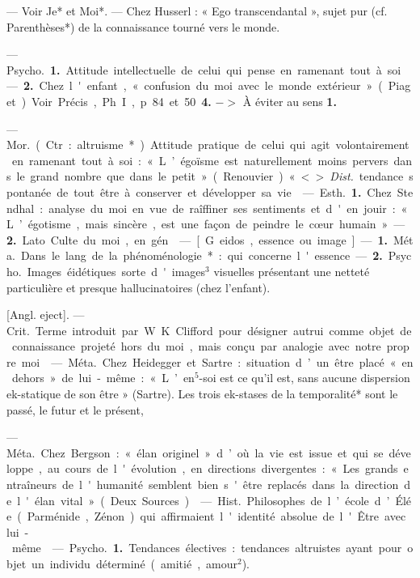 \begin{itemize}[leftmargin=1cm, label=, itemsep=1pt]
 — Voir Je* et Moi*. — Chez
Husserl : « Ego transcendantal »,
sujet pur (cf. Parenthèses*) de la
connaissance tourné vers le monde.

 — \si{Psycho.} {\bf 1.} Attitude
intellectuelle de celui qui pense
en ramenant tout à soi. — {\bf 2.} Chez
l'enfant, « confusion du moi avec le
monde extérieur » (Piaget). Voir
Précis, Ph. I, p. 84 et 50 {\bf 4.} $->$ À
éviter au sens {\bf 1.}

 — \si{Mor.} (Ctr. : altruisme*).
Attitude pratique de celui qui agit
volontairement en ramenant tout à
soi : « L’égoïsme est naturellement
moins pervers dans le grand nombre
que dans le petit » (Renouvier).
«<> {\it Dist.} tendance spontanée de
tout être à conserver et développer
sa vie.

 — \si{Esth.} {\bf 1.} Chez Stendhal :
analyse du moi en vue de raîffiner
ses sentiments et d'en jouir : « L’égotisme, mais sincère, est une façon de
peindre le cœur humain ». — {\bf 2.} Lato
Culte du moi, en gén.

 — [G. eidos, essence ou image]
— {\bf 1.} \si{Méta.} Dans le lang. de la phénoménologie* : qui concerne l'essence.
— {\bf 2.} \si{Psycho.} Images éidétiques
sorte d'images$^3$ visuelles présentant
une netteté particulière et presque
hallucinatoires (chez l'enfant).

 [Angl. eject]. — \si{Crit.} Terme introduit par W. K. Clifford pour désigner autrui comme objet de connaissance projeté hors du moi, mais
conçu par analogie avec notre
propre moi.

 — \si{Méta.} Chez Heidegger
et Sartre : situation d’un être placé
« en dehors » de lui-même : « L’en$^5$-soi est ce qu'il est, sans aucune dispersion ek-statique de son être »
(Sartre). Les trois ek-stases de la
temporalité* sont le passé, le futur
et le présent,

 — \si{Méta.} Chez Bergson :
« élan originel » d’où la vie est issue
et qui se développe, au cours de
l'évolution, en directions divergentes : « Les grands entraîneurs de
l'humanité semblent bien s'être
replacés dans la direction de l'élan
vital » (Deux Sources).

 — \si{Hist.} Philosophes de l’école
d’Élée (Parménide, Zénon) qui
affirmaient l'identité absolue de
l'Être avec lui-même.

 — \si{Psycho.} {\bf 1.} Tendances électives : tendances altruistes ayant
pour objet un individu déterminé
(amitié, amour$^2$).


\end{itemize}
